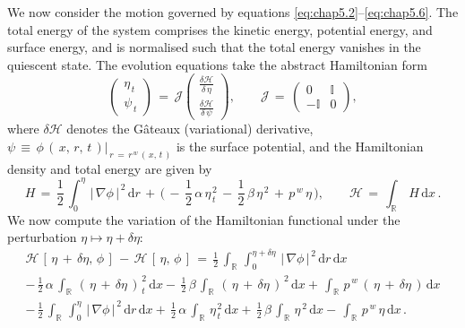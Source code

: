 \documentclass[alpha-refs, 12pt]{wiley-article}
\begin{document}
We now consider the motion governed by equations \eqref{eq:chap5.2}–\eqref{eq:chap5.6}. The total energy of the system comprises the kinetic energy, potential energy, and surface energy, and is normalised such that the total energy vanishes in the quiescent state. The evolution equations take the abstract Hamiltonian form
\begin{equation}
  \begin{pmatrix}
    \eta_{\,t} \\
    \psi_{\,t}
  \end{pmatrix}
  \,=\,\mathcal{J}
  \begin{pmatrix}
    \displaystyle\frac{\delta\mathcal{H}}{\delta\,\eta} \\[0.8em]
    \displaystyle\frac{\delta\mathcal{H}}{\delta\,\psi}
  \end{pmatrix},
  \qquad
  \mathcal{J}\,=\,\begin{pmatrix}
    0 & \mathbb{I} \\
    -\mathbb{I} & 0
  \end{pmatrix},
\end{equation}
where $\delta\mathcal{H}$ denotes the Gâteaux (variational) derivative, $\psi\,\equiv\,\phi\,(\,x,\,r,\,t\,)|_{\,r\,=\,r^{\,w}\,(\,x,\,t\,)}$ is the surface potential, and the Hamiltonian density and total energy are given by
\begin{equation}
  H\,=\,\frac{1}{2}\,\int_{0}^{\eta}\,|\,\nabla\phi\,|^{\,2}\,\mathrm{d}r\,+\,\biggl(\,-\,\frac{1}{2}\,\alpha\,\eta_{\,t}^{\,2}\,-\,\frac{1}{2}\,\beta\,\eta^{\,2}\,+\,p^{\,w}\,\eta\,\biggr), \qquad
  \mathcal{H}\,=\,\int_{\mathbb{R}}\,H\,\mathrm{d}x\,.
\end{equation}
We now compute the variation of the Hamiltonian functional under the perturbation $\eta \mapsto \eta + \delta \eta$:
\begin{multline*}
  \mathcal{H}\,[\,\eta\,+\,\delta\eta,\,\phi\,]\,-\,\mathcal{H}\,[\,\eta,\,\phi\,]
  \,=\,\frac{1}{2}\,\int_{\mathbb{R}}\,\int_{0}^{\eta+\delta\eta}\,|\,\nabla\phi\,|^{\,2}\,\mathrm{d}r\,\mathrm{d}x
  \\[0.5em]
  -\,\frac{1}{2}\,\alpha\,\int_{\mathbb{R}}\,(\,\eta\,+\,\delta\eta\,)_{\,t}^{\,2}\,\mathrm{d}x
  -\,\frac{1}{2}\,\beta\,\int_{\mathbb{R}}\,(\,\eta\,+\,\delta\eta\,)^{\,2}\,\mathrm{d}x
  +\,\int_{\mathbb{R}}\,p^{\,w}\,(\,\eta\,+\,\delta\eta\,)\,\mathrm{d}x
  \\[0.5em]
  -\,\frac{1}{2}\,\int_{\mathbb{R}}\,\int_{0}^{\eta}\,|\,\nabla\phi\,|^{\,2}\,\mathrm{d}r\,\mathrm{d}x
  +\,\frac{1}{2}\,\alpha\,\int_{\mathbb{R}}\,\eta_{\,t}^{\,2}\,\mathrm{d}x
  +\,\frac{1}{2}\,\beta\,\int_{\mathbb{R}}\,\eta^{\,2}\,\mathrm{d}x
  -\,\int_{\mathbb{R}}\,p^{\,w}\,\eta\,\mathrm{d}x\,.
\end{multline*}
\end{document}
